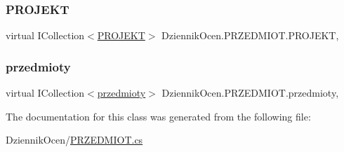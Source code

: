 \subsubsection{\texorpdfstring{P\+R\+O\+J\+E\+KT}{PROJEKT}}
{\footnotesize\ttfamily virtual I\+Collection$<$\hyperlink{class_dziennik_ocen_1_1_p_r_o_j_e_k_t}{P\+R\+O\+J\+E\+KT}$>$ Dziennik\+Ocen.\+P\+R\+Z\+E\+D\+M\+I\+O\+T.\+P\+R\+O\+J\+E\+KT\hspace{0.3cm}{\ttfamily [get]}, {\ttfamily [set]}}

\mbox{\label{class_dziennik_ocen_1_1_p_r_z_e_d_m_i_o_t_ab8bbdf31a57590aff3786e6cf5d86d68}} 
\subsubsection{\texorpdfstring{przedmioty}{przedmioty}}
{\footnotesize\ttfamily virtual I\+Collection$<$\hyperlink{class_dziennik_ocen_1_1przedmioty}{przedmioty}$>$ Dziennik\+Ocen.\+P\+R\+Z\+E\+D\+M\+I\+O\+T.\+przedmioty\hspace{0.3cm}{\ttfamily [get]}, {\ttfamily [set]}}



The documentation for this class was generated from the following file\+:\begin{DoxyCompactItemize}
\item 
Dziennik\+Ocen/\hyperlink{_p_r_z_e_d_m_i_o_t_8cs}{P\+R\+Z\+E\+D\+M\+I\+O\+T.\+cs}\end{DoxyCompactItemize}
